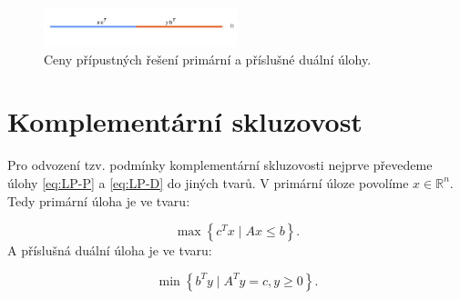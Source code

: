 \begin{figure}[h!]
    \centering
    \includegraphics[width=0.5\textwidth]{img/strong_duality.png}
    \caption{Ceny přípustných řešení primární a příslušné duální úlohy.}
    \label{fig:strong_duality}
\end{figure}

\section{Komplementární skluzovost}

Pro odvození tzv. podmínky komplementární skluzovosti nejprve převedeme úlohy \ref{eq:LP-P} a \ref{eq:LP-D} do jiných tvarů. V primární úloze povolíme $x \in \mathbb{R}^n$. Tedy primární úloha je ve tvaru:

\begin{equation}\tag{LP-P2}
    \max \left\{ c^T x \mid Ax \leq b \right\}.
    \label{eq:LP-P2}
\end{equation}
A příslušná duální úloha je ve tvaru:

\begin{equation}\tag{LP-D2}
    \min \left\{ b^T y \mid A^T y = c, y \geq 0 \right\}.
    \label{eq:LP-D2}
\end{equation}

